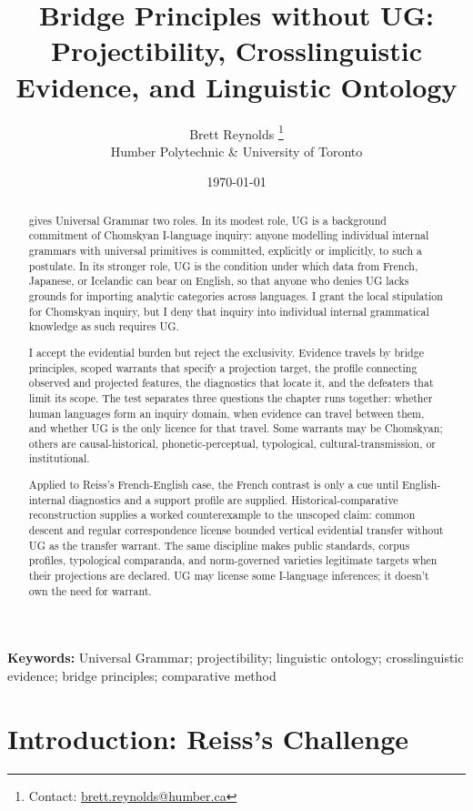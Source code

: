 \documentclass[12pt]{article}
\title{Bridge Principles without UG: Projectibility, Crosslinguistic Evidence, and Linguistic Ontology}
\author{Brett Reynolds \orcidlink{0000-0003-0073-7195}%
\thanks{Contact: \href{mailto:brett.reynolds@humber.ca}{brett.reynolds@humber.ca}}\\
Humber Polytechnic \& University of Toronto}
\date{\today}
\begin{document}
\maketitle

\begin{abstract}
\textcite{reiss2026armchair} gives Universal Grammar two roles. In its modest role, UG is a background commitment of Chomskyan I-language inquiry: anyone modelling individual internal grammars with universal primitives is committed, explicitly or implicitly, to such a postulate. In its stronger role, UG is the condition under which data from French, Japanese, or Icelandic can bear on English, so that anyone who denies UG lacks grounds for importing analytic categories across languages. I grant the local stipulation for Chomskyan inquiry, but I deny that inquiry into individual internal grammatical knowledge as such requires UG.

I accept the evidential burden but reject the exclusivity. Evidence travels by bridge principles, scoped warrants that specify a projection target, the profile connecting observed and projected features, the diagnostics that locate it, and the defeaters that limit its scope. The test separates three questions the chapter runs together: whether human languages form an inquiry domain, when evidence can travel between them, and whether UG is the only licence for that travel. Some warrants may be Chomskyan; others are causal-historical, phonetic-perceptual, typological, cultural-transmission, or institutional.

Applied to Reiss's French-English  case, the French contrast is only a cue until English-internal diagnostics and a support profile are supplied. Historical-comparative reconstruction supplies a worked counterexample to the unscoped claim: common descent and regular correspondence license bounded vertical evidential transfer without UG as the transfer warrant. The same discipline makes public standards, corpus profiles, typological comparanda, and norm-governed varieties legitimate targets when their projections are declared. UG may license some I-language inferences; it doesn't own the need for warrant.
\end{abstract}

\noindent\textbf{Keywords:} Universal Grammar; projectibility; linguistic ontology; crosslinguistic evidence; bridge principles; comparative method

\section{Introduction: Reiss's Challenge}
\end{document}
